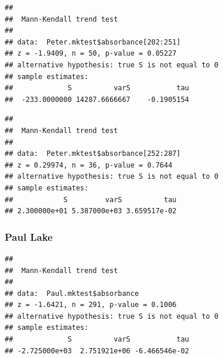 \documentclass[12pt,]{article}
\newenvironment{Shaded}{\begin{snugshade}}{\end{snugshade}}
\newcommand{\KeywordTok}[1]{\textcolor[rgb]{0.13,0.29,0.53}{\textbf{#1}}}
\newcommand{\DecValTok}[1]{\textcolor[rgb]{0.00,0.00,0.81}{#1}}
\newcommand{\StringTok}[1]{\textcolor[rgb]{0.31,0.60,0.02}{#1}}
\newcommand{\CommentTok}[1]{\textcolor[rgb]{0.56,0.35,0.01}{\textit{#1}}}
\newcommand{\OperatorTok}[1]{\textcolor[rgb]{0.81,0.36,0.00}{\textbf{#1}}}
\newcommand{\NormalTok}[1]{#1}
\begin{document}
\begin{verbatim}
## 
##  Mann-Kendall trend test
## 
## data:  Peter.mktest$absorbance[202:251]
## z = -1.9409, n = 50, p-value = 0.05227
## alternative hypothesis: true S is not equal to 0
## sample estimates:
##             S          varS           tau 
##  -233.0000000 14287.6666667    -0.1905154
\end{verbatim}

\begin{Shaded}
\end{Shaded}

\begin{verbatim}
## 
##  Mann-Kendall trend test
## 
## data:  Peter.mktest$absorbance[252:287]
## z = 0.29974, n = 36, p-value = 0.7644
## alternative hypothesis: true S is not equal to 0
## sample estimates:
##            S         varS          tau 
## 2.300000e+01 5.387000e+03 3.659517e-02
\end{verbatim}

\subsubsection{Paul Lake}\label{paul-lake}

\begin{Shaded}
\end{Shaded}

\begin{verbatim}
## 
##  Mann-Kendall trend test
## 
## data:  Paul.mktest$absorbance
## z = -1.6421, n = 291, p-value = 0.1006
## alternative hypothesis: true S is not equal to 0
## sample estimates:
##             S          varS           tau 
## -2.725000e+03  2.751921e+06 -6.466546e-02
\end{verbatim}
\end{document}
